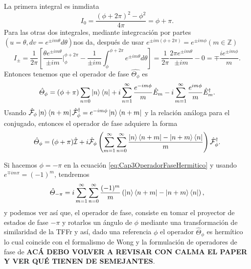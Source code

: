             La primera integral es inmdiata
            \begin{equation*}
                I_0 = \frac{(\phi+2\pi)^2 - \phi^2}{4\pi} = \phi+\pi.
            \end{equation*}
            Para las otras dos integrales, mediante integrcación por partes $(u=\theta, dv=e^{\pm im\theta}d\theta)$nos da, después de usar $e^{\pm im(\phi+2\pi)} = e^{\pm im\phi} (m\in \mathbb{Z})$
            \begin{equation*}
                I_\pm  = \frac{1}{2\pi} \left[\frac{\theta e^{\pm im\theta}}{\pm im}|_\phi^{\phi+2\pi} - \frac{1}{\pm im}\int_\phi^{\phi +2\pi} e^{\pm im\theta}d\theta  \right] = \frac{1}{2\pi} \frac{2\pi e^{\pm im\theta}}{\pm im} - 0 = \mp \frac{ie^{\pm im\phi}}{m}.
            \end{equation*}
            Entonces tenemos que el operador de fase $\hat{\Theta_\phi}$ es
            \begin{equation}\label{eq:Cap3OperadorFaseHermitico}
                \hat{\Theta}_\phi = (\phi + \pi)\sum_{n=0}\ket{n}\bra{n} + i \sum_{n=1}^\infty \frac{e^{-im\phi}}{m}\hat{E}_m -i\sum_{m=1}^{\infty} \frac{e^{im\phi}}{m}\hat{E}_m^\dagger.
            \end{equation}
            Usando $\hat{\mathcal{F}}_\phi \ket{n}\bra{n+m}\hat{\mathcal{F}}_\phi^\dagger = e^{-im\phi}\ket{n}\bra{n+m}$ y la relación análoga para el conjugado, entonces el operador de fase adquiere la forma
            \begin{equation}\label{eq:Cap3OperadorFaseHermiticoFourier}
                \hat{\Theta}_\phi = (\phi+\pi)\hat{\mathcal{I}} + i \hat{\mathcal{F}}_\phi \left(\sum_{m=1}^{\infty}\sum_{n=0}^{\infty}\frac{\ket{n}\bra{n+m} - \ket{n+m}\bra{n}}{m} \right)\hat{\mathcal{F}}_\phi^\dagger.
            \end{equation}

            Si hacemos $\phi = -\pi$ en la ecuación \ref{eq:Cap3OperadorFaseHermitico} y usando $e^{\mp im\pi}=(-1)^m$, tendremos
            \begin{equation}\label{eq:Cap3OperadorFaseMenosPi}
                \hat{\Theta}_{-\pi} = i \sum_{m=1}^{\infty}\sum_{n=0}^{\infty} \frac{(-1)^m}{m}\left(\ket{n}\bra{n+m} - \ket{n+m}\bra{n} \right),
            \end{equation}
            y podemos ver así que, el operador de fase, consiste en tomar el proyector de estados de fase $-\pi$ y rotarlos un ángulo de $\phi$ mediante una transformación de similaridad de la TFFr y así, dado una referencia $\phi$ el operador $\hat{\Theta}_\phi$ es hermítico lo cual coincide con el formalismo de Wong \cite{Garrison1970} y la formulación de operadores de fase de \cite{Bergou1991} \textbf{ACÁ DEBO VOLVER A REVISAR CON CALMA EL PAPER Y VER QUÉ TIENEN DE SEMEJANTES}.

